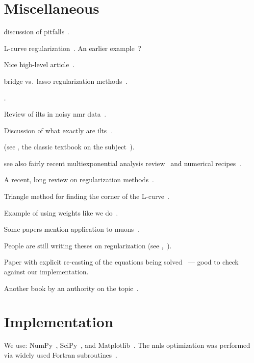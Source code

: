 \section{Miscellaneous \label{sec:miscellaneous}}

discussion of pitfalls~\cite{1983-Varah-SIAMJSSC-4-164}.

L-curve regularization~\cite{1992-Hansen-SIAMR-34-561, 1993-Hansen-SIAMJSC-14-1487}.
An earlier example~\cite{1990-Hansen-SIAMJSSC-11-503}?

Nice high-level article~\cite{1994-Craig-CP-8-648}.

bridge vs.\ lasso regularization methods~\cite{1998-Wenjiang-JCGS-7-397}.

\cite{2002-Venkataramanan-IEEETSP-50-1017}.

Review of \glspl{ilt} in noisy \gls{nmr} data~\cite{2013-Berman-CMRPA-42-72}.

Discussion of what exactly are \glspl{ilt}~\cite{2017-Fordham-DF-29-2}.

(see , the classic textbook on the subject~\cite{1995-Lawson-SLSP}).

see also fairly recent multiexponential analysis review~\cite{1999-Istratov-RSI-70-1233} and numerical recipes~\cite{numerical-recipies}.

A recent, long review on regularization methods~\cite{2018-Benning-AN-27-1}.

Triangle method for finding the corner of the L-curve~\cite{2002-Castellanos-ANM-43-359}.

Example of using weights like we do~\cite{1999-Dunn-JMR-140-153}.

Some papers mention application to muons~\cite{1984-Honig-JCAM-10-113}.

People are still writing theses on regularization (see ,~\cite{2011-OrozcoRodriguez-PhD}).

Paper with explicit re-casting of the equations being solved~\cite{2001-OLeary-SIAMJSC-23-1161} --- good to check against our implementation.

Another book by an authority on the topic~\cite{1998-Hansen-RDDIPP}.

\section{Implementation \label{sec:implementation}}

We use:
NumPy~\cite{2011-vanderWalt-CSE-13-22},
SciPy~\cite{2020-Virtanen-NM},
and Matplotlib~\cite{2007-Hunter-CSE-9-90}.
The \gls{nnls} optimization was performed via widely used Fortran subroutines~\cite{1995-Lawson-SLSP}.
